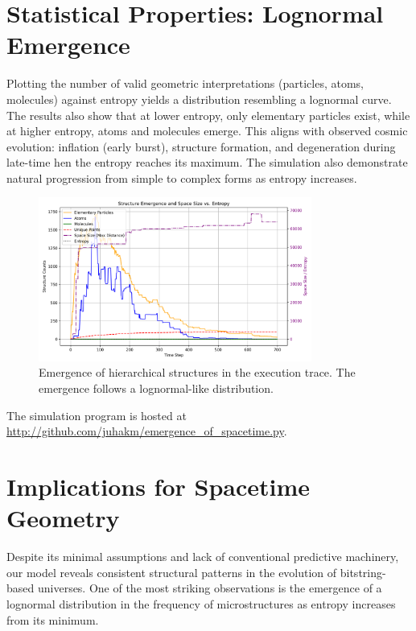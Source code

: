 \documentclass[11pt]{article}
\begin{document}
\section{Statistical Properties: Lognormal Emergence}

Plotting the number of valid geometric interpretations (particles, atoms, molecules) against entropy yields a distribution resembling a lognormal curve.  The results also show that at lower entropy, only elementary particles exist, while at higher entropy, atoms and molecules emerge. This aligns with observed cosmic evolution: inflation (early burst), structure formation, and degeneration during late-time hen the entropy reaches its maximum. The simulation also demonstrate natural progression from simple to complex forms as entropy increases.

\begin{figure}[h!]
   \centering
   \includegraphics[width=0.8\textwidth]{figures/entropy_to_matter.png}
   \caption{Emergence of hierarchical structures in the execution trace. The emergence follows a lognormal-like distribution.}
   \label{fig:lognormal-structure}
\end{figure}

The simulation program is hosted at \url{http://github.com/juhakm/emergence_of_spacetime.py}.


\section*{Implications for Spacetime Geometry}

Despite its minimal assumptions and lack of conventional predictive machinery, our model reveals consistent structural patterns in the evolution of bitstring-based universes. One of the most striking observations is the emergence of a lognormal distribution in the frequency of microstructures as entropy increases from its minimum.
\end{document}
